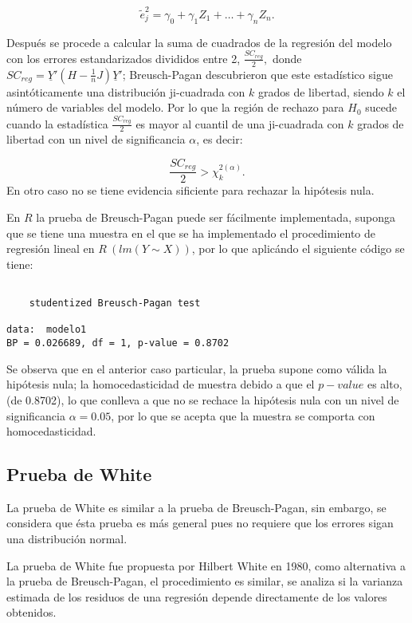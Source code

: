 \documentclass[
  a4paper,
  oneside,
  openany]{book}
\begin{document}
\[\tilde{e}_{j}^{2}=\gamma_{0}+\gamma_{1}Z_{1}+ \ldots + \gamma_{n}Z_{n}.\]

Después se procede a calcular la suma de cuadrados de la regresión del modelo con los errores estandarizados divididos entre 2, \(\frac{SC_{reg}}{2},\) donde \(SC_{reg}=\underline{Y}'(H-\frac{1}{n}J)\underline{Y}'\); Breusch-Pagan descubrieron que este estadístico sigue asintóticamente una distribución ji-cuadrada con \(k\) grados de libertad, siendo \(k\) el número de variables del modelo. Por lo que la región de rechazo para \(H_0\) sucede cuando la estadística \(\frac{SC_{reg}}{2}\) es mayor al cuantil de una ji-cuadrada con \(k\) grados de libertad con un nivel de significancia \(\alpha\), es decir:

\[\frac{SC_{reg}}{2}> \chi^{2(\alpha)}_{k}.\]
En otro caso no se tiene evidencia sificiente para rechazar la hipótesis nula.

En \(R\) la prueba de Breusch-Pagan puede ser fácilmente implementada, suponga que se tiene una muestra en el que se ha implementado el procedimiento de regresión lineal en \(R \ (lm(Y \sim X))\), por lo que aplicándo el siguiente código se tiene:

\begin{verbatim}

    studentized Breusch-Pagan test

data:  modelo1
BP = 0.026689, df = 1, p-value = 0.8702
\end{verbatim}

Se observa que en el anterior caso particular, la prueba supone como válida la hipótesis nula; la homocedasticidad de muestra debido a que el \(p-value\) es alto, (de 0.8702), lo que conlleva a que no se rechace la hipótesis nula con un nivel de significancia \(\alpha=0.05\), por lo que se acepta que la muestra se comporta con homocedasticidad.

\hypertarget{prueba-de-white}{%
\subsection{Prueba de White}\label{prueba-de-white}}

La prueba de White es similar a la prueba de Breusch-Pagan, sin embargo, se considera que ésta prueba es más general pues no requiere que los errores sigan una distribución normal.

La prueba de White fue propuesta por Hilbert White en 1980, como alternativa a la prueba de Breusch-Pagan, el procedimiento es similar, se analiza si la varianza estimada de los residuos de una regresión depende directamente de los valores obtenidos.
\end{document}

